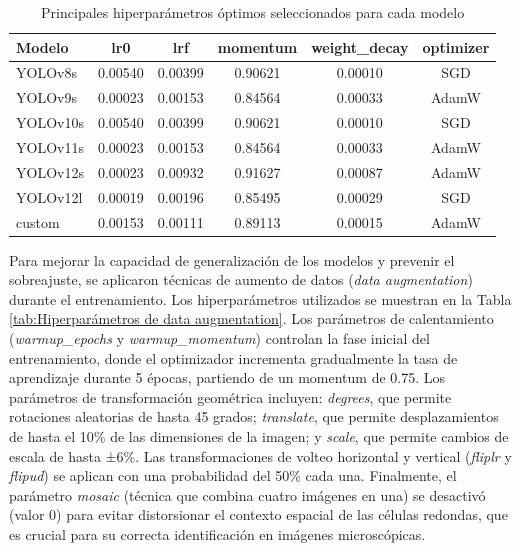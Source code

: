 \documentclass[12pt,a4paper,onecolumn,oneside]{report}
\begin{document}
\begin{table}[H]
\caption{Principales hiperparámetros óptimos seleccionados para cada modelo}
\label{tab:Principales hiperparámetros óptimos seleccionados para cada modelo}
\centering
\begin{tabular}{lccccc}
\toprule
\textbf{Modelo} & \textbf{lr0} & \textbf{lrf} & \textbf{momentum} & \textbf{weight\_decay} & \textbf{optimizer} \\
\midrule
YOLOv8s   & 0.00540 & 0.00399 & 0.90621 & 0.00010 & SGD \\
YOLOv9s   & 0.00023 & 0.00153 & 0.84564 & 0.00033 & AdamW \\
YOLOv10s  & 0.00540 & 0.00399 & 0.90621 & 0.00010 & SGD \\
YOLOv11s  & 0.00023 & 0.00153 & 0.84564 & 0.00033 & AdamW \\
YOLOv12s  & 0.00023 & 0.00932 & 0.91627 & 0.00087 & AdamW \\
YOLOv12l  & 0.00019 & 0.00196 & 0.85495 & 0.00029 & SGD \\
custom    & 0.00153 & 0.00111 & 0.89113 & 0.00015 & AdamW \\
\bottomrule
\end{tabular}
\end{table}

Para mejorar la capacidad de generalización de los modelos y prevenir el sobreajuste, se aplicaron técnicas de aumento de datos (\textit{data augmentation}) 
durante el entrenamiento. Los hiperparámetros utilizados se muestran en la Tabla \ref{tab:Hiperparámetros de data augmentation}. Los parámetros de calentamiento 
(\textit{warmup\_epochs} y \textit{warmup\_momentum}) controlan la fase inicial del entrenamiento, donde el optimizador incrementa gradualmente la tasa de 
aprendizaje durante 5 épocas, partiendo de un momentum de 0.75. Los parámetros de transformación geométrica incluyen: \textit{degrees}, que permite rotaciones 
aleatorias de hasta 45 grados; \textit{translate}, que permite desplazamientos de hasta el 10\% de las dimensiones de la imagen; y \textit{scale}, que permite 
cambios de escala de hasta ±6\%. Las transformaciones de volteo horizontal y vertical (\textit{fliplr} y \textit{flipud}) se aplican con una probabilidad del 50\% 
cada una. Finalmente, el parámetro \textit{mosaic} (técnica que combina cuatro imágenes en una) se desactivó (valor 0) para evitar distorsionar el contexto 
espacial de las células redondas, que es crucial para su correcta identificación en imágenes microscópicas.
\end{document}
